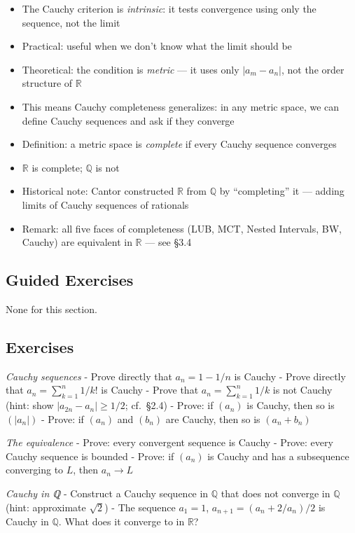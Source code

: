 \documentclass[
  10pt,
  letterpaper,
]{scrbook}
\providecommand{\tightlist}{%
  \setlength{\itemsep}{0pt}\setlength{\parskip}{0pt}}
\newcommand{\QQ}{\mathbb{Q}}
\newcommand{\RR}{\mathbb{R}}
\begin{document}
\begin{itemize}
\tightlist
\item
  The Cauchy criterion is \emph{intrinsic}: it tests convergence using
  only the sequence, not the limit
\item
  Practical: useful when we don't know what the limit should be
\item
  Theoretical: the condition is \emph{metric} --- it uses only
  \(|a_m - a_n|\), not the order structure of \(\RR\)
\item
  This means Cauchy completeness generalizes: in any metric space, we
  can define Cauchy sequences and ask if they converge
\item
  Definition: a metric space is \emph{complete} if every Cauchy sequence
  converges
\item
  \(\RR\) is complete; \(\QQ\) is not
\item
  Historical note: Cantor constructed \(\RR\) from \(\QQ\) by
  ``completing'' it --- adding limits of Cauchy sequences of rationals
\item
  Remark: all five faces of completeness (LUB, MCT, Nested Intervals,
  BW, Cauchy) are equivalent in \(\RR\) --- see §3.4
\end{itemize}

\subsection{Guided Exercises}\label{guided-exercises-8}

None for this section.

\subsection{Exercises}\label{exercises-13}

\emph{Cauchy sequences} - Prove directly that \(a_n = 1 - 1/n\) is
Cauchy - Prove directly that \(a_n = \sum_{k=1}^{n} 1/k!\) is Cauchy -
Prove that \(a_n = \sum_{k=1}^{n} 1/k\) is not Cauchy (hint: show
\(|a_{2n} - a_n| \geq 1/2\); cf.~§2.4) - Prove: if \((a_n)\) is Cauchy,
then so is \((|a_n|)\) - Prove: if \((a_n)\) and \((b_n)\) are Cauchy,
then so is \((a_n + b_n)\)

\emph{The equivalence} - Prove: every convergent sequence is Cauchy -
Prove: every Cauchy sequence is bounded - Prove: if \((a_n)\) is Cauchy
and has a subsequence converging to \(L\), then \(a_n \to L\)

\emph{Cauchy in ℚ} - Construct a Cauchy sequence in \(\QQ\) that does
not converge in \(\QQ\) (hint: approximate \(\sqrt{2}\)) - The sequence
\(a_1 = 1\), \(a_{n+1} = (a_n + 2/a_n)/2\) is Cauchy in \(\QQ\). What
does it converge to in \(\RR\)?
\end{document}
